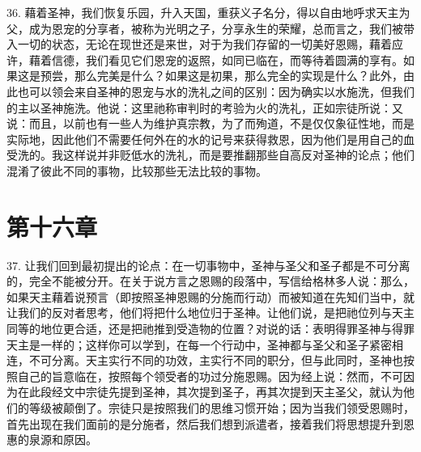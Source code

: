36. 藉着圣神，我们恢复乐园，升入天国，重获义子名分，得以自由地呼求天主为父，成为恩宠的分享者，被称为光明之子，分享永生的荣耀，总而言之，我们被带入一切的状态，无论在现世还是来世，对于为我们存留的一切美好恩赐，藉着应许，藉着信德，我们看见它们恩宠的返照，如同已临在，而等待着圆满的享有。如果这是预尝，那么完美是什么？如果这是初果，那么完全的实现是什么？此外，由此也可以领会来自圣神的恩宠与水的洗礼之间的区别：因为确实以水施洗，但我们的主以圣神施洗。他说：这里祂称审判时的考验为火的洗礼，正如宗徒所说：又说：而且，以前也有一些人为维护真宗教，为了而殉道，不是仅仅象征性地，而是实际地，因此他们不需要任何外在的水的记号来获得救恩，因为他们是用自己的血受洗的。我这样说并非贬低水的洗礼，而是要推翻那些自高反对圣神的论点；他们混淆了彼此不同的事物，比较那些无法比较的事物。\par


\section{第十六章}

\par

37. 让我们回到最初提出的论点：在一切事物中，圣神与圣父和圣子都是不可分离的，完全不能被分开。在关于说方言之恩赐的段落中，写信给格林多人说：那么，如果天主藉着说预言（即按照圣神恩赐的分施而行动）而被知道在先知们当中，就让我们的反对者思考，他们将把什么地位归于圣神。让他们说，是把祂位列与天主同等的地位更合适，还是把祂推到受造物的位置？对说的话：表明得罪圣神与得罪天主是一样的；这样你可以学到，在每一个行动中，圣神都与圣父和圣子紧密相连，不可分离。天主实行不同的功效，主实行不同的职分，但与此同时，圣神也按照自己的旨意临在，按照每个领受者的功过分施恩赐。因为经上说：然而，不可因为在此段经文中宗徒先提到圣神，其次提到圣子，再其次提到天主圣父，就认为他们的等级被颠倒了。宗徒只是按照我们的思维习惯开始；因为当我们领受恩赐时，首先出现在我们面前的是分施者，然后我们想到派遣者，接着我们将思想提升到恩惠的泉源和原因。\par

